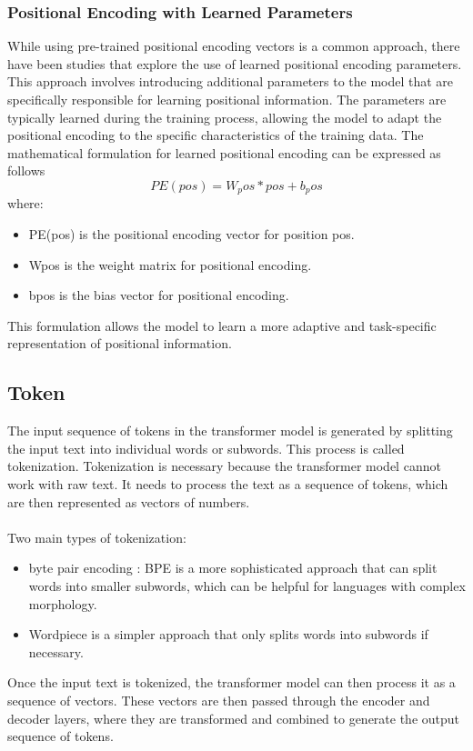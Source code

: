 \documentclass{article}
\begin{document}
\subsubsection{Positional Encoding with Learned Parameters}
While using pre-trained positional encoding vectors is a common approach, there have been studies that explore the use of learned positional encoding parameters. This approach involves introducing additional parameters to the model that are specifically responsible for learning positional information. The parameters are typically learned during the training process, allowing the model to adapt the positional encoding to the specific characteristics of the training data.
The mathematical formulation for learned positional encoding can be expressed as follows \\
\[ PE(pos) = W_pos * pos + b_pos \]
where:
\begin{itemize}
    \item PE(pos) is the positional encoding vector for position pos.
    \item Wpos is the weight matrix for positional encoding.
    \item bpos is the bias vector for positional encoding.
\end{itemize}

This formulation allows the model to learn a more adaptive and task-specific representation of positional information.

\subsection{Token} 
The input sequence of tokens in the transformer model is generated by splitting the input text into individual words or subwords. This process is called tokenization. Tokenization is necessary because the transformer model cannot work with raw text. It needs to process the text as a sequence of tokens, which are then represented as vectors of numbers. \\ \\
Two main types of tokenization: 
\begin{itemize}
    \item byte pair encoding : BPE is a more sophisticated approach that can split words into smaller subwords, which can be helpful for languages with complex morphology.
    \item Wordpiece is a simpler approach that only splits words into subwords if necessary.
\end{itemize}
Once the input text is tokenized, the transformer model can then process it as a sequence of vectors. These vectors are then passed through the encoder and decoder layers, where they are transformed and combined to generate the output sequence of tokens.
\end{document}
